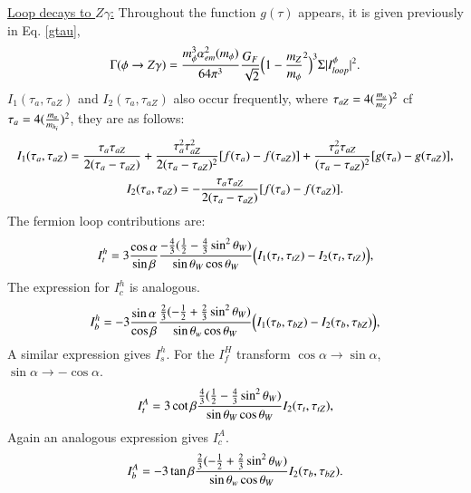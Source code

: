 \documentclass[final,3p,times,pdflatex]{elsarticle}
\begin{document}
\underline{Loop decays to $Z \gamma$:}
Throughout the function $g(\tau)$ appears, it is given previously in Eq. \eqref{gtau},
\begin{equation} \label{phiZgam}
\Gamma(\phi \rightarrow Z \gamma) = {m_{\phi}^3 \alpha_{em}^2(m_{\phi}) \over 64 \pi^3} {G_{F} \over \sqrt{2}} \Big(1-{m_Z \over m_\phi}^2\Big)^3  \Sigma|I_{loop}^{\phi}|^2.
\end{equation}
$I_1(\tau_{a},\tau_{aZ})$ and $I_2(\tau_{a},\tau_{aZ})$ also occur frequently, where $\tau_{aZ} = 4({m_{a} \over m_{Z}})^2$ cf $\tau_{a} = 4({m_{a} \over m_{h_i}})^2$, they are as follows:
\begin{equation}
I_{1}(\tau_{a},\tau_{aZ}) = {\tau_{a} \tau_{aZ} \over 2 (\tau_{a}-\tau_{aZ})} + {\tau_{a}^2 \tau_{aZ}^2 \over 2(\tau_{a}-\tau_{aZ})^2}[f(\tau_{a})-f(\tau_{aZ})] + {\tau_{a}^2 \tau_{aZ} \over (\tau_{a}-\tau_{aZ})^2}[g(\tau_{a})-g(\tau_{aZ})],
\end{equation}
\begin{equation}
I_{2}(\tau_{a},\tau_{aZ}) = -{\tau_{a} \tau_{aZ} \over 2(\tau_{a}-\tau_{aZ})}[f(\tau_{a})-f(\tau_{aZ})].
\end{equation}
The fermion loop contributions are:
\begin{equation}
I_{t}^h = 3 {\cos\alpha \over \sin\beta}{-{4\over 3}({1\over2} - {4 \over 3}\sin^2 \theta_W) \over \sin\theta_W \cos\theta_W} \Big(I_{1}(\tau_t,\tau_{tZ}) -I_{2}(\tau_t,\tau_{tZ})\Big),
\end{equation}
The expression for $I_{c}^h$ is analogous.
\begin{equation}
I_{b}^h = -3{\sin\alpha \over \cos\beta}{{2 \over 3}(-{1\over 2}+{2\over 3}\sin^2 \theta_W) \over \sin\theta_w \cos\theta_W}\Big(I_{1}(\tau_b,\tau_{bZ}) -I_{2}(\tau_b,\tau_{bZ})\Big) ,
\end{equation}
A similar expression gives $I_{s}^h$.
For the $I_{f}^H$ transform $\cos\alpha \rightarrow \sin\alpha$, $\sin\alpha \rightarrow -\cos\alpha$.
\begin{equation}
I_{t}^A = 3 \cot\beta{{4\over 3}({1\over2} - {4 \over 3}\sin^2 \theta_W) \over \sin\theta_W \cos\theta_W} I_{2}(\tau_t,\tau_{tZ}),
\end{equation}
Again an analogous expression gives $I_{c}^A$.
\begin{equation}
I_{b}^A = -3\tan\beta{{2 \over 3}(-{1\over 2}+{2\over 3}\sin^2 \theta_W) \over \sin\theta_w \cos\theta_W}I_{2}(\tau_b,\tau_{bZ}).
\end{equation}
\end{document}
